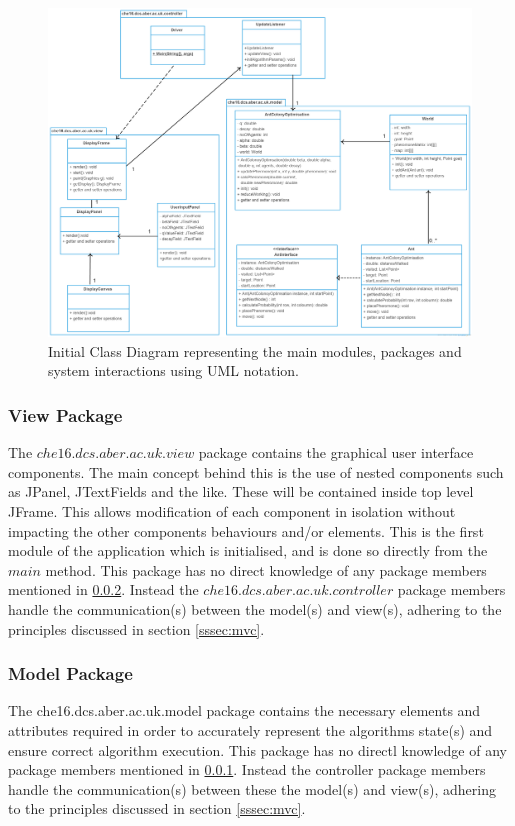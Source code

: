 \clearpage
\begin{figure}
\includegraphics[scale=0.225]{Images/design/diss-uml}
\caption{Initial Class Diagram representing the main modules, packages and system interactions using UML notation.}
\label{fig:classdiagram}
\end{figure}
\clearpage

\subsubsection{View Package}

\label{sssec:view}
The $che16.dcs.aber.ac.uk.view$ package contains the graphical user interface components. The main concept behind this is the use of nested components such as JPanel, JTextFields and the like. These will be contained inside top level JFrame. This allows modification of each component in isolation without impacting the other components behaviours and/or elements. This is the first module of the application which is initialised, and is done so directly from the $main$ method. This package has no direct knowledge of any package members mentioned in \ref{sssec:model}. Instead the $che16.dcs.aber.ac.uk.controller$ package members handle the communication(s) between the model(s) and view(s), adhering to the principles discussed in section \ref{sssec:mvc}.

\subsubsection{Model Package}
\label{sssec:model}
The che16.dcs.aber.ac.uk.model package contains the necessary elements and attributes required in order to accurately represent the algorithms state(s) and ensure correct algorithm execution. This package has no directl knowledge of any package members mentioned in \ref{sssec:view}. Instead the controller package members handle the communication(s) between these the model(s) and view(s), adhering to the principles discussed in section \ref{sssec:mvc}.

